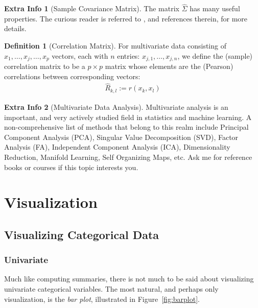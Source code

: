 \documentclass[12pt,a4paper]{report}
\theoremstyle{plain}
\theoremstyle{definition}
\newtheorem{definition}{Definition}
\newtheorem{extra}{Extra Info}
\begin{document}
\begin{extra}[Sample Covariance Matrix]
The matrix $\hat{\Sigma}$ has many useful properties. 
The curious reader is referred to \cite{petersen_matrix_2006}, and references therein, for more details.
\end{extra}

\begin{definition}[Correlation Matrix]
For multivariate data consisting of $x_1,\dots,x_j,\dots,x_p$ vectors, each with $n$ entries: $x_{j,1},\dots,x_{j,n}$, we define the (sample) correlation matrix to be a $p\times p$ matrix whose elements are the (Pearson) correlations between corresponding vectors:
\begin{align}
	\hat{R}_{k,l}:= r(x_k, x_l)
\end{align}
\end{definition}


\begin{extra}[Multivariate Data Analysis]
Multivariate analysis is an important, and very actively studied field in statistics and machine learning.
A non-comprehensive list of methods that belong to this realm include 
Principal Component Analysis (PCA),
Singular Value Decomposition (SVD), 
Factor Analysis (FA), 
Independent Component Analysis (ICA),
Dimensionality Reduction, 
Manifold Learning, 
Self Organizing Maps, 
etc.
Ask me for reference books or courses if this topic interests you.
\end{extra}

\afterpage{\clearpage}


\section{Visualization}
\label{sec:visualizations}

\subsection{Visualizing Categorical Data}



\subsubsection{Univariate}
Much like computing summaries, there is not much to be said about visualizing univariate categorical variables. 
The most natural, and perhaps only visualization, is the \emph{bar plot}, illustrated in Figure~\ref{fig:barplot}.
\end{document}
